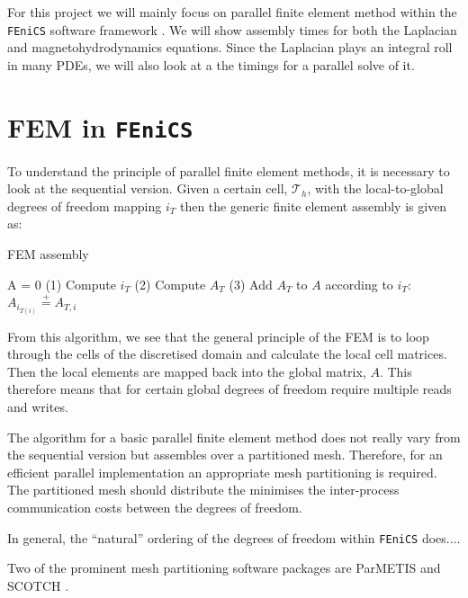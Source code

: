 \documentclass[10pt]{article}
\newcommand{\fenics}{{\tt FEniCS} }
\begin{document}
For this project we will mainly focus on parallel finite element method within the \fenics  software framework \cite{wells2012automated}. We will show assembly times for both the Laplacian and magnetohydrodynamics equations. Since the Laplacian plays an integral roll in many PDEs, we will also look at a the timings for a parallel solve of it.


\section{FEM in \fenics}

To understand the principle of parallel finite element methods, it is necessary to look at the sequential version. Given a certain cell, $\mathcal{T}_h$, with the local-to-global degrees of freedom mapping $i_T$ then the generic finite element assembly is given as:
\begin{algorithm}

FEM assembly
    \begin{algorithmic}[1]
    \State A = 0
        \State (1) Compute $i_T$
        \State (2) Compute $A_T$
        \State (3) Add $A_T$ to $A$ according to $i_T$:
            \State $ A_{i_{T(i)}} \stackrel{+}{=} A_{T,i}$
        \EndFor
    \EndFor
    \end{algorithmic}
\end{algorithm}

From this algorithm, we see that the general principle of the FEM is to loop through the cells of the discretised domain and calculate the local cell matrices. Then the local elements are mapped back into the global matrix, $A$. This therefore means that for certain global degrees of freedom require multiple reads and writes.

The algorithm for a basic parallel finite element method does not really vary from the sequential version but assembles over a partitioned mesh. Therefore, for an efficient parallel implementation an appropriate mesh partitioning is required. The partitioned mesh should distribute the minimises the inter-process communication costs between the degrees of freedom.

In general, the ``natural'' ordering of the degrees of freedom within \fenics does....

 Two of the prominent mesh partitioning software packages are ParMETIS \cite{parmetis} and SCOTCH \cite{scotch}.

\end{document}
